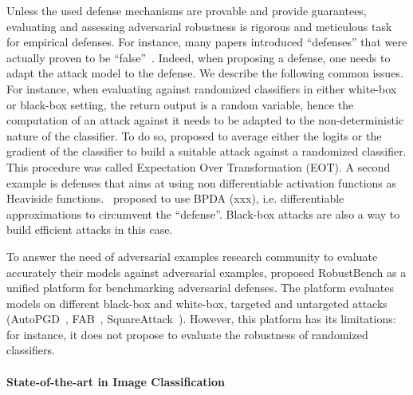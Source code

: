 Unless the used defense mechanisms are provable and provide guarantees, evaluating and assessing adversarial robustness is rigorous and meticulous task for empirical defenses. For instance, many papers introduced ``defenses'' that were actually proven to be ``false''~\citep{athalye2018obfuscated,carlini2019evaluating}. Indeed, when proposing a defense, one needs to adapt the attack model to the defense. We describe the following common issues. For instance, when evaluating against randomized classifiers in either white-box or black-box setting, the return output is a random variable, hence the computation of an attack against it needs to be adapted to the non-deterministic nature of the classifier. To do so, \cite{athalye2018obfuscated} proposed to average either the logits or the gradient of the classifier to build a suitable attack against a randomized classifier. This procedure was called Expectation Over Transformation (EOT). A second example is defenses that aims at using non differentiable activation functions as Heaviside functions.~\cite{athalye2017synthesizing} proposed to use BPDA (xxx), i.e. differentiable approximations to circumvent the ``defense''. Black-box attacks are also a way to build efficient attacks in this case. 

To answer the need of adversarial examples research community to evaluate accurately their models against adversarial examples, \cite{croce2020robustbench} proposed RobustBench as a unified platform for benchmarking adversarial defenses. The platform evaluates models on different black-box and white-box, targeted and untargeted attacks (AutoPGD~\citep{Croce2020ReliableEO}, FAB~\citep{Croce2020MinimallyDA}, SquareAttack~\citep{andriushchenko2019square}). However, this platform has its limitations:  for instance, it  does not propose to evaluate the robustness of randomized classifiers. 

\paragraph{State-of-the-art in Image Classification}

